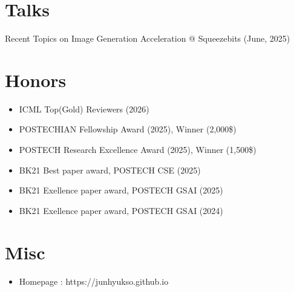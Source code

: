\documentclass[a4paper,20pt]{article}
\newcommand{\resumeItem}[2]{
  \item\small{
    \textbf{#1}{ #2 \vspace{-2pt}}
  }
}
\newcommand{\resumeSubItem}[2]{\resumeItem{#1}{#2}\vspace{-3pt}}
\newcommand{\resumeSubHeadingListStart}{\begin{itemize}[leftmargin=*]}
\newcommand{\resumeSubHeadingListEnd}{\end{itemize}}
\begin{document}

\section{Talks}
\begin{description}[font=$\bullet$]
\item {Recent Topics on Image Generation Acceleration @ Squeezebits (June, 2025)}



\end{description}


\vspace{-5pt}
\section{Honors}
\begin{itemize}
    \item ICML Top(Gold) Reviewers (2026)
    \item POSTECHIAN Fellowship Award (2025), Winner (2,000\$)
    \item POSTECH Research Excellence Award (2025), Winner (1,500\$)
    \item BK21 Best paper award, POSTECH CSE (2025)
    \item BK21 Exellence paper award, POSTECH GSAI (2025)
    \item BK21 Exellence paper award, POSTECH GSAI (2024)
\end{itemize}
\section{Misc}
\begin{itemize}
    \item Homepage : https://junhyukso.github.io

\end{itemize}
\end{document}
